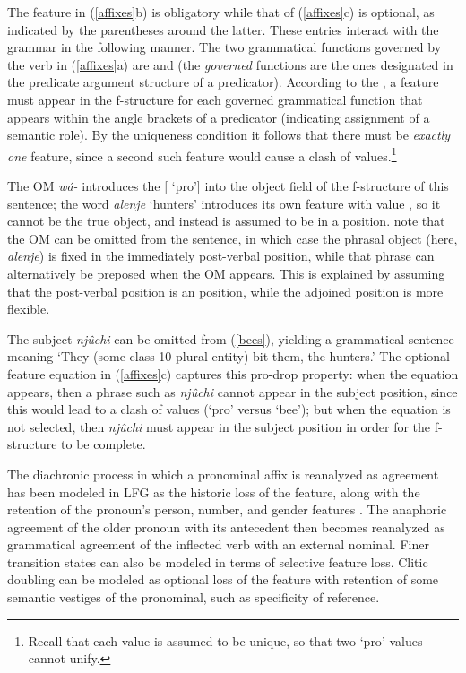 \noindent
The  feature in (\ref{affixes}b) is obligatory while that of (\ref{affixes}c) is optional, as indicated by the parentheses around the latter.  These entries interact with the grammar in the following manner.  The two grammatical functions governed by the verb in (\ref{affixes}a) are  and  (the \textit{governed} functions are the ones designated in the predicate argument structure of a predicator).  According to the , a  feature must appear in the f-structure for each governed grammatical function that appears within the angle brackets of a predicator (indicating assignment of a semantic role).  By the uniqueness condition it follows that there must be \textit{exactly one}  feature, since a second such feature would cause a clash of values.\footnote{Recall that each  value is assumed to be unique, so that two `{pro}' values cannot unify.}  

The OM {\it w\'{a}-} introduces the [ `{pro}'] into the object field of the f-structure of this sentence; the word \textit{alenje} `hunters' introduces its own  feature with value , so it cannot be the true object, and instead is assumed to be in a  position.  \citet[744--745]{bresnan+mchombo:1987} note that the OM can be omitted from the sentence, in which case the phrasal object (here, \textit{alenje}) is fixed in the immediately post-verbal position, while that phrase can alternatively be preposed when the OM appears.  This is explained by assuming that the post-verbal position is an  position, while the adjoined  position is more flexible.  

The subject \textit{nj\^{u}chi} can be omitted from (\ref{bees}), yielding a grammatical sentence meaning `They (some class 10 plural entity) bit them, the hunters.'  The optional  feature equation in (\ref{affixes}c) captures this pro-drop property: when the equation appears, then a phrase such as \textit{nj\^{u}chi} cannot appear in the subject position, since this would lead to a clash of  values 
(`{pro}' versus `{bee}'); but when the equation is not selected, then  \textit{nj\^{u}chi} must appear in the subject position in order for the f-structure to be complete.  

The diachronic process in which a pronominal affix is reanalyzed as agreement has been modeled in LFG as the historic loss of the  feature, along with the retention of the pronoun's person, number, and gender features \citep{coppock+wechsler:2010}.  The anaphoric agreement of the older pronoun with its antecedent then becomes reanalyzed as grammatical agreement of the inflected verb with an external nominal.  Finer transition states can also be modeled in terms of selective feature loss.  Clitic doubling can be modeled as optional loss of the  feature with retention of some semantic vestiges of the pronominal, such as specificity of reference.

